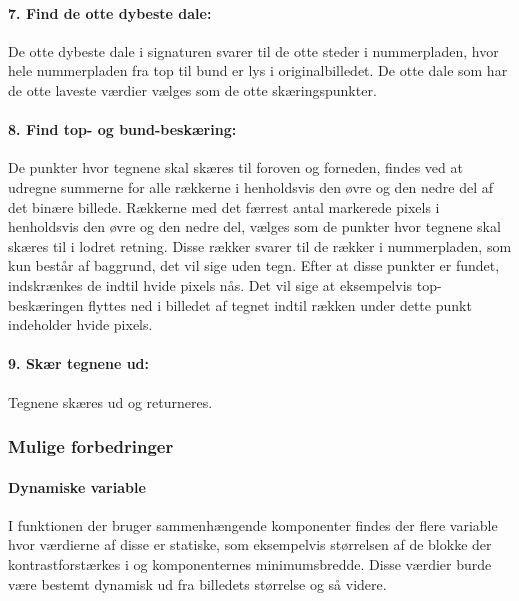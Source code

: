 \paragraph{7. Find de otte dybeste dale:}
De otte dybeste dale i signaturen svarer til de otte steder i nummerpladen, hvor hele nummerpladen fra top til bund er lys i originalbilledet. De otte dale som har de otte laveste værdier vælges som de otte skæringspunkter.

\paragraph{8. Find top- og bund-beskæring:} De punkter hvor tegnene skal skæres til foroven og forneden, findes ved at udregne summerne for alle rækkerne i henholdsvis den øvre og den nedre del af det binære billede. Rækkerne med det færrest antal markerede pixels i henholdsvis den øvre og den nedre del, vælges som de punkter hvor tegnene skal skæres til i lodret retning. Disse rækker svarer til de rækker i nummerpladen, som kun består af baggrund, det vil sige uden tegn. Efter at disse punkter er fundet, indskrænkes de indtil hvide pixels nås. Det vil sige at eksempelvis top-beskæringen flyttes ned i billedet af tegnet indtil rækken under dette punkt indeholder hvide pixels.

\paragraph{9. Skær tegnene ud:} Tegnene skæres ud og returneres.


\subsubsection{Mulige forbedringer}

\paragraph{Dynamiske variable}
I funktionen der bruger sammenhængende komponenter findes der flere variable hvor værdierne af disse er statiske, som eksempelvis størrelsen af de blokke der kontrastforstærkes i og komponenternes minimumsbredde. Disse værdier burde være bestemt dynamisk ud fra billedets størrelse og så videre.

